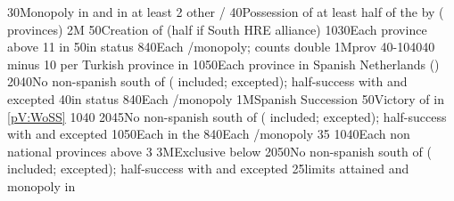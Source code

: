 %
%
{}{30}{Monopoly in  and in at least 2 other \CTZ/\STZ}%
%
%
%
{}{40}{Possession of at least half of the \payshongrie by \AUSaus (
  provinces)}%
%
\EUobjective2M{}{}%
{}{50}{Creation of  (half if South HRE alliance)}%
%
%
{10}{30}{Each province above 11 in \AUSaus}%
%
%
{}{50}{\paysportugal in \ANNEXION status}%
%
%
{8}{40}{Each \CTZ/\STZ monopoly;  counts double}%
%
%
\EUobjective1M{\payshongrie}{\TUR prov}%
{40-10}{40}{40 \VPs minus 10 \VPs per Turkish province in \payshongrie}%
%
%
{10}{50}{Each province in Spanish Netherlands (\regionBelgique)}%
%
%
{20}{40}{No non-spanish \COL south of 
  ( included;  excepted); half-success
  with  and  excepted}%
%
%
{}{40}{\paysportugal in \ANNEXION status}%
%
%
{8}{40}{Each \CTZ/\STZ monopoly}%
%
%
\EUobjective1M{Spanish Succession}{}%
{}{50}{Victory of \SPA in \ref{pV:WoSS}}%
%
%
{10}{40}{}%
%
%
{20}{45}{No non-spanish \COL south of 
  ( included;  excepted); half-success
  with  and  excepted}%
%
%
{10}{50}{Each \Presidio in the }%
%
%
{8}{40}{Each \CTZ/\STZ monopoly}%
%
%
%
{}{35}{}%
%
%
{10}{40}{Each non national provinces above 3}%
%
\EUobjective3M{Exclusive below }{}%
{20}{50}{No non-spanish \COL south of 
  ( included;  excepted); half-success
  with  and  excepted}%
%
%
{}{25}{\MNU limits attained and monopoly in }%
